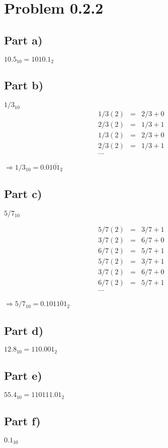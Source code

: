 \documentclass[12pt]{article}
\begin{document}
\section*{Problem 0.2.2}

\subsection*{Part a)}
\(10.5_{10} = 1010.1_{2}\)
\subsection*{Part b)}
\(1/3_{10}\)\\

\begin{eqnarray*}
1/3(2) & = & 2/3 + 0\\
2/3(2) & = & 1/3 + 1\\
1/3(2) & = & 2/3 + 0\\
2/3(2) & = & 1/3 + 1\\
...
\end{eqnarray*}

\(\Rightarrow 1/3_{10} = 0.01\overline{01}_{2}\)

\subsection*{Part c)}
\(5/7_{10}\)

\begin{eqnarray*}
5/7(2) & = & 3/7 + 1\\
3/7(2) & = & 6/7 + 0\\
6/7(2) & = & 5/7 + 1\\
5/7(2) & = & 3/7 + 1\\
3/7(2) & = & 6/7 + 0\\
6/7(2) & = & 5/7 + 1\\
...   
\end{eqnarray*}

\(\Rightarrow 5/7_{10} = 0.101\overline{101}_{2}\)
\subsection*{Part d)}
\(12.8_{10} = 110.001_{2}\)
\subsection*{Part e)}
\(55.4_{10} = 110111.01_{2}\)
\subsection*{Part f)}
\(0.1_{10}\)
\end{document}
